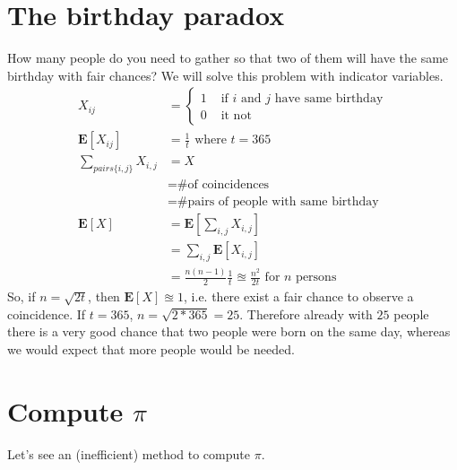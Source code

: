 \section{The birthday paradox}
How many people do you need to gather so that two of them will have the same birthday with fair chances? We will solve this problem with indicator variables.
\begin{align*}
X_{ij} &=
  \left\{
      \begin{aligned}
      	1 &\text{ if $i$ and $j$ have same birthday} \\
        0 &\text{ it not }
      \end{aligned}
    \right.\\
\mathbf{E}[X_{ij}] &= \frac{1}{t} \text{ where $t = 365$}\\
\sum_{pairs \{i,j\}} X_{i,j} &= X\\
&= \text{\# of coincidences}\\
&= \text{\# pairs of people with same birthday}\\
\mathbf{E}[X] &=  \mathbf{E}[\sum_{i,j} X_{i,j}] \\
&= \sum_{i,j}  \mathbf{E}[X_{i,j}] \\
&= \frac{n(n-1)}{2} \frac{1}{t} \approxeq \frac{n^2}{2t} \text{ for $n$ persons}
\end{align*}
So, if $n = \sqrt{2t}$, then $\mathbf{E}[X] \approxeq 1$, i.e. there exist a fair chance to observe a coincidence. If $t = 365$, $n = \sqrt{2*365} = 25$. Therefore already with $25$ people there is a very good chance that two people were born on the same day, whereas we would expect that more people would be needed.



\section{Compute $\pi$}
Let's see an (inefficient) method to compute $\pi$.
